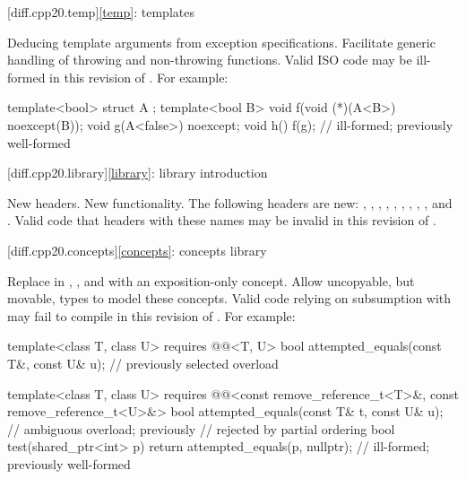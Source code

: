 [diff.cpp20.temp]{\ref{temp}: templates}

\change
Deducing template arguments from exception specifications.
\rationale
Facilitate generic handling of throwing and non-throwing functions.
\effect
Valid ISO \CppXX{} code may be ill-formed in this revision of \Cpp{}.
For example:
\begin{codeblock}
template<bool> struct A { };
template<bool B> void f(void (*)(A<B>) noexcept(B));
void g(A<false>) noexcept;
void h() {
  f(g);                         // ill-formed; previously well-formed
}
\end{codeblock}

[diff.cpp20.library]{\ref{library}: library introduction}

\change
New headers.
\rationale
New functionality.
\effect
The following \Cpp{} headers are new:
,
,
,
,
,
,
,
,
, and
.
Valid \CppXX{} code that  headers with these names may be
invalid in this revision of \Cpp{}.

[diff.cpp20.concepts]{\ref{concepts}: concepts library}

\change
Replace  in ,
, and 
with an exposition-only concept.
\rationale
Allow uncopyable, but movable, types to model these concepts.
\effect
Valid \CppXX{} code relying on subsumption
with 
may fail to compile in this revision of \Cpp{}.
For example:
\begin{codeblock}
template<class T, class U>
  requires @@<T, U>
bool attempted_equals(const T&, const U& u);    // previously selected overload

template<class T, class U>
  requires @@<const remove_reference_t<T>&, const remove_reference_t<U>&>
bool attempted_equals(const T& t, const U& u);  // ambiguous overload; previously
                                                // rejected by partial ordering
bool test(shared_ptr<int> p) {
  return attempted_equals(p, nullptr);          // ill-formed; previously well-formed
}
\end{codeblock}


